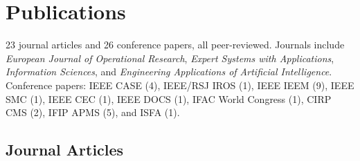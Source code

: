 \documentclass[11pt,a4paper]{article}
\newlength{\datecol}
\newenvironment{cvlist}{%
  \begin{list}{}{%
    \setlength{\leftmargin}{\datecol}%
    \setlength{\labelwidth}{\datecol}%
    \setlength{\labelsep}{0pt}%
    \setlength{\itemsep}{3pt}%
    \setlength{\parsep}{0pt}%
    \setlength{\topsep}{2pt}%
    \renewcommand{\makelabel}[1]{##1\hfil}}%
  \raggedright}%
  {\end{list}}
\begin{document}
\section{Publications}

\begin{cvlist}
\item[] 23 journal articles and 26 conference papers, all peer-reviewed.
  Journals include \textit{European Journal of Operational Research},
  \textit{Expert Systems with Applications}, \textit{Information Sciences}, and
  \textit{Engineering Applications of Artificial Intelligence}. Conference
  papers: IEEE CASE (4), IEEE/RSJ IROS (1), IEEE IEEM (9), IEEE SMC (1), IEEE
  CEC (1), IEEE DOCS (1), IFAC World Congress (1), CIRP CMS (2), IFIP APMS (5),
  and ISFA (1).
\end{cvlist}

\subsection*{Journal Articles}
\end{document}
